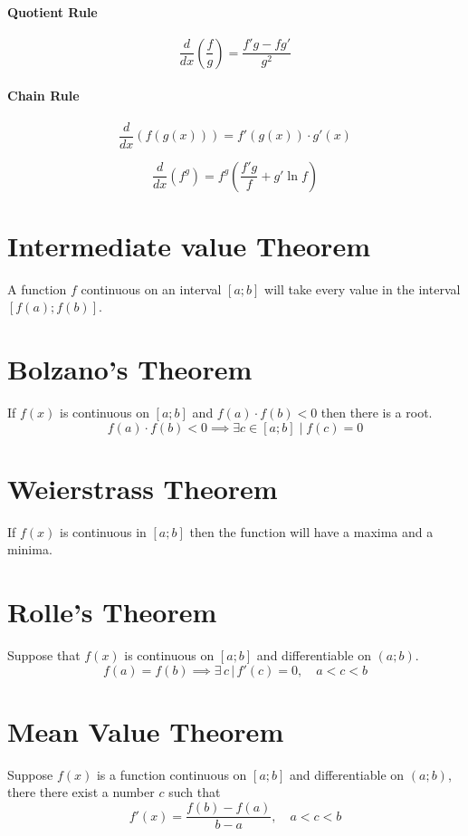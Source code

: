 \documentclass{article}
\begin{document}
\paragraph{Quotient Rule}
\[
    \frac{d}{dx}\left(\frac{f}{g}\right)=\frac{f'g-fg'}{g^2}
\]

\paragraph{Chain Rule}
\[
    \frac{d}{dx}(f(g(x)))=f'(g(x))\cdot g'(x)
\]

\[
    \frac{d}{dx}(f^g)=f^g\left(\frac{f'g}{f}+g'\ln f\right)
\]

\pagebreak

\section{Intermediate value Theorem}

A function \(f\) continuous on an interval \([a;b]\) will take
every value in the interval \([f(a);f(b)]\).

\section{Bolzano's Theorem}

If \(f(x)\) is continuous on \([a;b]\) and \(f(a)\cdot f(b) <0\) then there is a root.
\[
    f(a)\cdot f(b) <0 \implies \exists c \in [a;b] \mid f(c) = 0
\]

\section{Weierstrass Theorem}

If \(f(x)\) is continuous in \([a;b]\) then the function will have a maxima and a minima.

\section{Rolle's Theorem}
Suppose that \(f(x)\) is continuous on \([a;b]\) and differentiable on \((a;b)\).
\[
    f(a)=f(b) \implies \exists \,c \,|\, f'(c) = 0, \quad
    a < c < b
\]

\section{Mean Value Theorem}

Suppose \(f(x)\) is a function continuous on \([a;b]\) and
differentiable on \((a;b)\), there there exist a number \(c\) such that
\[
    f'(x)=\frac{f(b)-f(a)}{b-a}, \quad a<c<b
\]
\end{document}
